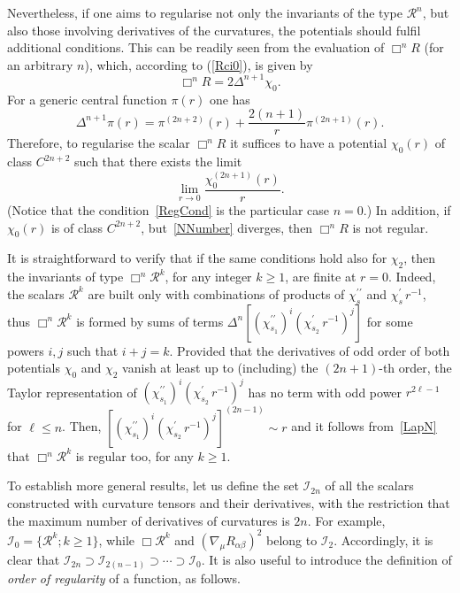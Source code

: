 \documentclass[aps,prd,a4paper,twocolumn,showpacs,showkeys,preprintnumbers,amsmath,amssymb,nofootinbib]{revtex4-2}
\numberwithin{equation}{section}
\def\beq{\begin{equation}}
\def\eeq{\end{equation}}
\newcommand{\eq}[1]{(\ref{#1})}
\def\al{\alpha}
\def\be{\beta}
\def\De{\Delta}
\def\lap{\Delta}
\begin{document}
Nevertheless, if one aims to regularise not only the invariants of the type $\mathcal{R}^n$, but also those involving derivatives of the curvatures, the potentials should fulfil additional conditions. This can be readily seen from the evaluation of $\Box^n R$ (for an arbitrary $n$), which, according to \eq{Rci0}, is given by 
\beq
\label{LapN_R}
\Box^n R =  2 \lap^{n+1} \chi_0.
\eeq 
For a generic central function $\pi(r)$ one has
\beq 
\label{LapN}
\lap^{n+1} \pi(r)  = \pi ^{(2n+2)}(r) + \frac{2(n+1) }{r} \pi ^{(2n+1)} (r)
.
\eeq
Therefore, to regularise the scalar  $\Box^n R$ it suffices to have a potential $\chi_0(r)$ of class $C^{2n+2}$ such that there exists the limit
\beq \label{NNumber}
\lim_{r \to 0}  \frac{\chi_0^{(2n+1)}(r)}{r}   .
\eeq
(Notice that the condition~\eqref{RegCond} is the particular case $n=0$.)
In addition, if $\chi_0(r)$ is of class $C^{2n+2}$, but~\eqref{NNumber} diverges, then $\Box^n R$ is not regular.

It is straightforward to verify that if the same conditions hold also for $\chi_2$, then the invariants of type $\Box^n \mathcal{R}^k$, for any integer $k\geqslant 1$, are finite at $r=0$. Indeed, the scalars $\mathcal{R}^k$ are built only with combinations of products of $\chi_s^{\prime\prime}$ and $\chi_s^\prime \, r^{-1}$, thus $\Box^n \mathcal{R}^k$ is formed by sums of terms $\De^n [ (\chi_{s_1}^{\prime\prime})^i (\chi_{s_2}^\prime \, r^{-1})^j ] $ for some powers $i,j$ such that $i+j=k$. Provided that the derivatives of odd order of both potentials $\chi_{0}$ and $\chi_{2}$ vanish at least up to (including) the $(2n+1)$-th order, the Taylor representation of 
$(\chi_{s_1}^{\prime\prime})^i (\chi_{s_2}^\prime \, r^{-1})^j$ has no term with odd power $r^{2\ell-1}$ for $\ell \leqslant n$. Then,  $[(\chi_{s_1}^{\prime\prime})^i (\chi_{s_2}^\prime \, r^{-1})^j]^{(2n-1)}\sim r$ and it follows from~\eqref{LapN} that
$\Box^n \mathcal{R}^k$ is regular too, for any $k \geqslant 1$. 

To establish more general results, let us define the set $\mathscr{I}_{2n}$ of all the scalars constructed with curvature tensors and their derivatives, with the restriction that the maximum number of derivatives of curvatures is $2n$. For example, 
$\mathscr{I}_{0} = \lbrace \mathcal{R}^k ; k \geqslant 1 \rbrace$,
while $\Box \mathcal{R}^k$ and $(\nabla_{\mu}{R}_{\al\be})^2$ belong to $\mathscr{I}_{2}$. Accordingly, it is clear that $\mathscr{I}_{2n} \supset \mathscr{I}_{2(n-1)} \supset \cdots \supset \mathscr{I}_{0}$. It is also useful to introduce the definition of \textit{order of regularity} of a function, as follows.
\end{document}
